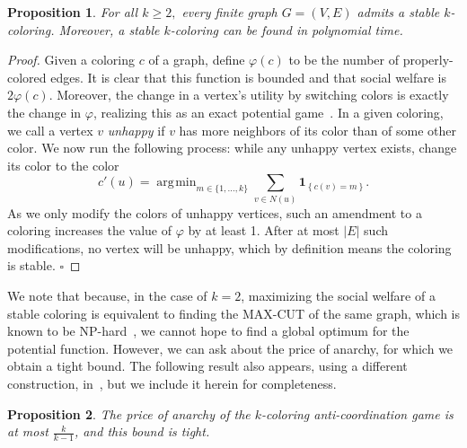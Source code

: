 \documentclass{llncs}
\newcommand{\ind}[1]{\textbf{1}_{\left \{ #1 \right \}}}
\newtheorem{propn}{Proposition}
\DeclareMathOperator*{\argmin}{\arg\!\min}
\begin{document}
\begin{propn}\label{propn:alg}
For all $k \ge 2,$ every finite graph $G=(V,E)$ admits a stable $k$-coloring.
Moreover, a stable $k$-coloring can be found in polynomial time.
\end{propn}

\begin{proof}
Given a coloring $c$ of a graph, define $\varphi(c)$ to be the number of 
properly-colored edges. It is clear that this function is bounded and that
social welfare is $2 \varphi(c)$. Moreover, the change in a vertex's utility by
switching colors is exactly the change in $\varphi$, realizing this as an exact
potential game~\cite{M96}. In a given coloring, we call a vertex $v$ \emph{unhappy} if $v$
has more neighbors of its color than of some other color.  We now run the
following process: while any unhappy vertex exists, change its color to the
color
\begin{equation}\label{eq:greedy}
c'(u) = \argmin_{m \in \{1, \ldots, k\}} \sum_{ v \in N(u)}\ind{c(v) = m}.
\end{equation}
As we only modify the colors of unhappy vertices, such an amendment to a
coloring increases the value of $\varphi$ by at least 1. After at most $|E|$
such modifications, no vertex will be unhappy, which by definition means the
coloring is stable. \hfill $\square$
\end{proof}

We note that because, in the case of $k=2$, maximizing the social welfare of a
stable coloring is equivalent to finding the MAX-CUT of the same graph, which
is known to be NP-hard~\cite{GareyJ79}, we cannot hope to find a global optimum
for the potential function.  However, we can ask about the price of anarchy, for
which we obtain a tight bound.  The following result also appears, using
a different construction, in~\cite{Hoefer2007}, but we include it herein for completeness.

\begin{propn}\label{obs:poa}
The price of anarchy of the $k$-coloring anti-coordination game is at most
$\frac{k}{k-1}$, and this bound is tight.
\end{propn}
\end{document}
